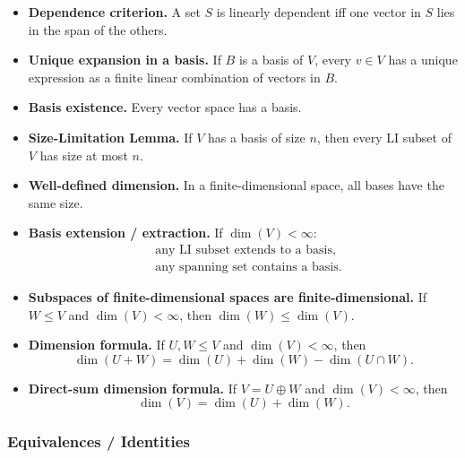 \begin{itemize}[leftmargin=*]
\item \textbf{Dependence criterion.} A set $S$ is linearly dependent iff one vector in $S$ lies in the span of the others.

\item \textbf{Unique expansion in a basis.} If $B$ is a basis of $V$, every $v\in V$ has a unique expression as a finite linear combination of vectors in $B$.

\item \textbf{Basis existence.} Every vector space has a basis.

\item \textbf{Size-Limitation Lemma.} If $V$ has a basis of size $n$, then every LI subset of $V$ has size at most $n$.

\item \textbf{Well-defined dimension.} In a finite-dimensional space, all bases have the same size.

\item \textbf{Basis extension / extraction.} If $\dim(V)<\infty$:
\begin{align*}
&\text{any LI subset extends to a basis},\\
&\text{any spanning set contains a basis}.
\end{align*}

\item \textbf{Subspaces of finite-dimensional spaces are finite-dimensional.} If $W\le V$ and $\dim(V)<\infty$, then $\dim(W)\le \dim(V)$.

\item \textbf{Dimension formula.} If $U,W\le V$ and $\dim(V)<\infty$, then
\[
\dim(U+W)=\dim(U)+\dim(W)-\dim(U\cap W).
\]

\item \textbf{Direct-sum dimension formula.} If $V=U\oplus W$ and $\dim(V)<\infty$, then
\[
\dim(V)=\dim(U)+\dim(W).
\]
\end{itemize}

\subsubsection*{Equivalences / Identities}

